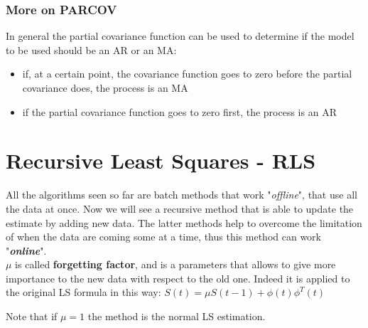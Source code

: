 \documentclass[10pt,a4paper]{article}
\begin{document}
\subsubsection{More on PARCOV}
In general the partial covariance function can be used to determine if the model to be used should be an AR or an MA:
\begin{itemize}
	\item if, at a certain point, the covariance function goes to zero before the partial covariance does, the process is an MA
	\item if the partial covariance function goes to zero first, the process is an AR
\end{itemize}
\section{Recursive Least Squares - RLS}
All the algorithms seen so far are batch methods that work "\textit{offline}", that use all the data at once. Now we will see a recursive method that is able to update the estimate by adding new data. The latter methods help to overcome the limitation of when the data are coming some at a time, thus this method can work "\textbf{\textit{online}}". \\
$\mu$ is called \textbf{forgetting factor}, and is a parameters that allows to give more importance to the new data with respect to the old one. Indeed it is applied to the original LS formula in this way: 
\center
	$S(t)=\mu S(t-1)+\phi(t)\phi^T(t)$
\\ \raggedright
Note that if $\mu=1$ the method is the normal LS estimation.
\end{document}

